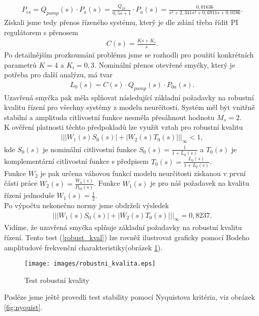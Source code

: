 \documentclass[12pt,a4paper]{article}
\begin{document}
\begin{enumerate}[I.]
\begin{enumerate}[1.]
{\begin{gather*}
				P_{cs} = Q_{pump}(s)\cdot P_a(s) = \frac{Q_{10}}{0{,}5s + 1}\cdot P_a(s) = \frac{0{,}01636}{s^3 + 2{,}341s^2 + 0{,}6911s + 0{,}0186}.
				\end{gather*}}
				Získali jsme tedy přenos řízeného systému, který je dle zdání třeba řídit PI regulátorem s přenosem
				\begin{gather*}
				C(s) = \frac{Ks + K_i}{s}.
				\end{gather*}
				Po detailnějším prozkoumání problému jsme se rozhodli pro použití konkrétních parametrů $K = 4$ a $K_i = 0{,}3$. Nominální přenos otevřené smyčky, který je potřeba pro další analýzu, má tvar
				\begin{gather*}
				L_0(s) = C(s)\cdot Q_{pump}(s)\cdot P_{0a}(s).
				\end{gather*}
				Uzavřená smyčka pak měla splňovat následující základní požadavky na robustní kvalitu řízení pro všechny systémy z modelu neurčitosti. Systém měl být vnitřně stabilní a amplituda citlivostní funkce nesměla přesáhnout hodnotu $M_s = 2$.\\
				K ověření platnosti těchto předpokladů lze využít vztah pro robustní kvalitu
				\begin{gather*}
				|||W_1(s)S_0(s)| + |W_2(s)T_0(s)|||_\infty < 1,
				\end{gather*}
				kde $S_0(s)$ je nominální citlivostní funkce $S_0(s) = \frac{1}{1 + L_0(s)}$ a $T_0(s)$ je komplementární citlivostní funkce s předpisem $T_0(s) = \frac{L_0(s)}{1+L_0(s)}$.\\
				Funkce $W_2$ je pak určena váhovou funkcí modelu neurčitosti získanou v první části práce $W_2(s) = \frac{W_a(s)}{P_{0a}(s)}$. Funkce $W_1(s)$ je pro náš požadavek na kvalitu řízení jednoduše $W_1(s) = \frac{1}{2}$.\\
				Po výpočtu nekonečno normy jsme obdrželi výsledek
				\begin{gather}
				|||W_1(s)S_0(s)| + |W_2(s)T_0(s)|||_\infty = 0{,}8237. \label{robust_kval}
				\end{gather}
				Vidíme, že uzavřená smyčka splňuje základní požadavky na robustní kvalitu řízení. Tento test (\ref{robust_kval}) lze rovněž ilustrovat graficky pomocí Bodeho amplitudové frekvenční charakteristiky(obrázek \ref{fig:robustni_kvalita}).
				\begin{figure}[H]
					\centering
					\texttt{[image: images/robustni\_kvalita.eps]}
					\caption{Test robustní kvality}
					\label{fig:robustni_kvalita}
				\end{figure}
				Posléze jsme ještě provedli test stability pomocí Nyquistova kritéria, viz obrázek \ref{fig:nyquist}.

\end{enumerate}
\end{enumerate}
\end{document}
